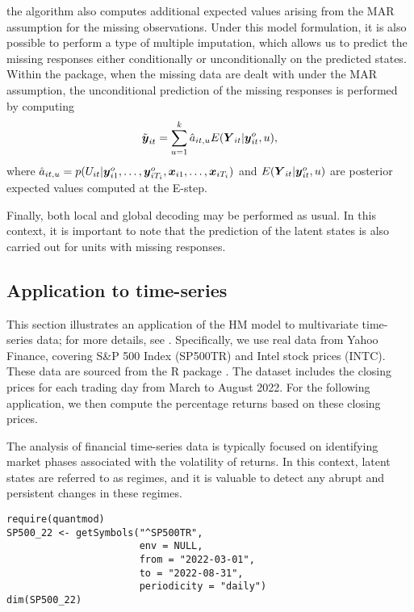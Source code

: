 the algorithm also computes additional expected values arising from the
MAR assumption for the missing observations. Under this model
formulation, it is also possible to perform a type of multiple
imputation, which allows us to predict the missing responses either
conditionally or unconditionally on the predicted states. Within the
 package, when the missing data are dealt with under the
MAR assumption, the unconditional prediction of the missing responses is
performed by computing
\[
\tilde{\mbox{\boldmath $y$}}_{it} = \sum_{u=1}^k \hat{a}_{it,u} E(\mbox{\boldmath $Y$}_{it}|\mbox{\boldmath $y$}_{it}^o, u),
\]
where
\(\hat{a}_{it,u} = p(U_{it}|\mbox{\boldmath $y$}_{i1}^o,\ldots,\mbox{\boldmath $y$}_{iT_i}^o, \mbox{\boldmath $x$}_{i1},\ldots,\mbox{\boldmath $x$}_{iT_i})\)
and \(E(\mbox{\boldmath $Y$}_{it}|\mbox{\boldmath $y$}_{it}^o, u)\) are posterior expected values
computed at the E-step.

Finally, both local and global decoding may be performed as usual. In
this context, it is important to note that the prediction of the latent
states is also carried out for units with missing responses.

\hypertarget{subsec:HMcontapp1}{%
\subsection{Application to time-series}\label{subsec:HMcontapp1}}

This section illustrates an application of the HM model to multivariate
time-series data; for more details, see \cite{penn:etal:22}.
Specifically, we use real data from Yahoo Finance, covering S\&P 500
Index (SP500TR) and Intel stock prices (INTC). These data are sourced
from the \textsf{R} package  \citep{quan:22}. The
dataset includes the closing prices for each trading day from March to
August 2022. For the following application, we then compute the
percentage returns based on these closing prices.

The analysis of financial time-series data is typically focused on
identifying market phases associated with the volatility of returns. In
this context, latent states are referred to as regimes, and it is
valuable to detect any abrupt and persistent changes in these regimes.

\begin{verbatim}
require(quantmod)
SP500_22 <- getSymbols("^SP500TR",
                       env = NULL,
                       from = "2022-03-01",
                       to = "2022-08-31",
                       periodicity = "daily")
dim(SP500_22)
\end{verbatim}

